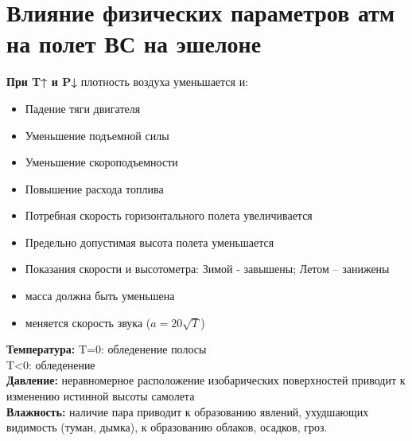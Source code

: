 
\section{Влияние физических параметров атм на полет ВС на эшелоне}
\textbf{При T↑ и P↓} плотность воздуха уменьшается и:
\begin{itemize}
	\item Падение тяги двигателя
	\item Уменьшение подъемной силы
	\item Уменьшение скороподъемности
	\item Повышение расхода топлива
	\item Потребная скорость горизонтального полета увеличивается
	\item Предельно допустимая высота полета уменьшается 
	\item Показания скорости и высотометра:  	Зимой -  завышены; Летом – занижены
	\item масса должна быть уменьшена
	\item меняется скорость звука ($a=20\sqrt{T}$)\\
\end{itemize}
\textbf{Температура:} T=0: обледенение полосы\\
T<0: обледенение\\

\textbf{Давление:} неравномерное расположение изобарических поверхностей приводит к изменению истинной высоты самолета\\

\textbf{Влажность:} наличие пара приводит к образованию явлений, ухудшающих видимость (туман, дымка), к образованию облаков, осадков, гроз.

